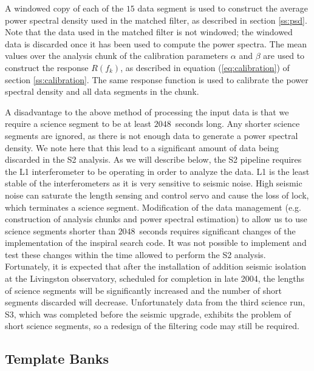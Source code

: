 A windowed copy of each of the $15$ data segment is used to construct the
average power spectral density used in the matched filter, as described in
section \ref{ss:psd}. Note that the data used in the matched filter is not
windowed; the windowed data is discarded once it has been used to compute the
power spectra.  The mean values over the analysis chunk of the calibration
parameters $\alpha$ and $\beta$ are used to construct the response $R(f_k)$,
as described in equation (\ref{eq:calibration}) of section \ref{ss:calibration}.
The same response function is used to calibrate the power spectral density and
all data segments in the chunk. 

A disadvantage to the above method of processing the input data is that we
require a science segment to be at least $2048$~seconds long. Any shorter
science segments are ignored, as there is not enough data to generate a power
spectral density. We note here that this lead to a significant amount of data
being discarded in the S2 analysis. As we will describe below, the S2 pipeline
requires the L1 interferometer to be operating in order to analyze the data.
L1 is the least stable of the interferometers as it is very sensitive to
seismic noise. High seismic noise can saturate the length sensing and control
servo and cause the loss of lock, which terminates a science segment.
Modification of the data management (e.g. construction of analysis chunks and
power spectral estimation) to allow us to use science segments shorter than
$2048$~seconds requires significant changes of the implementation of the
inspiral search code. It was not possible to implement and test these changes
within the time allowed to perform the S2 analysis. Fortunately, it is
expected that after the installation of addition seismic isolation at the
Livingston observatory, scheduled for completion in late 2004, the lengths of
science segments will be significantly increased and the number of short
segments discarded will decrease. Unfortunately data from the third science
run, S3, which was completed before the seismic upgrade, exhibits the problem
of short science segments, so a redesign of the filtering code may still be
required.

\subsection{Template Banks}
\label{ss:templatebank}

